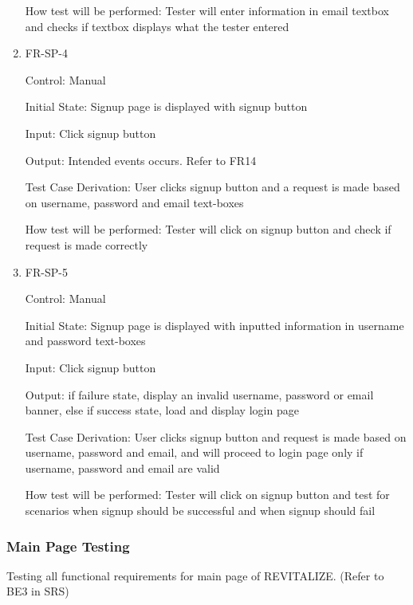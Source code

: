 \documentclass[12pt, titlepage]{article}
\begin{document}
\begin{enumerate}
	How test will be performed: Tester will enter information in email textbox and checks if textbox displays what the tester entered
	
	\item{FR-SP-4\\}
	
	Control: Manual
	
	Initial State: Signup page is displayed with signup button
	
	Input: Click signup button
	
	Output: Intended events occurs. Refer to FR14
	
	Test Case Derivation: User clicks signup button and a request is made based on username, password and email text-boxes
	
	How test will be performed: Tester will click on signup button and check if request is made correctly
	
	\item{FR-SP-5\\}
	
	Control: Manual
	
	Initial State: Signup page is displayed with inputted information in username and password text-boxes
	
	Input: Click signup button
	
	Output: if failure state, display an invalid username, password or email banner, else if success state, load and display login page
	
	Test Case Derivation: User clicks signup button and request is made based on username, password and email, and will proceed to login page only if username, password and email are valid
	
	How test will be performed: Tester will click on signup button and test for scenarios when signup should be successful and when signup should fail
	
	
\end{enumerate}

\subsubsection{Main Page Testing}

Testing all functional requirements for main page of REVITALIZE. (Refer to BE3 in SRS)
\end{document}
